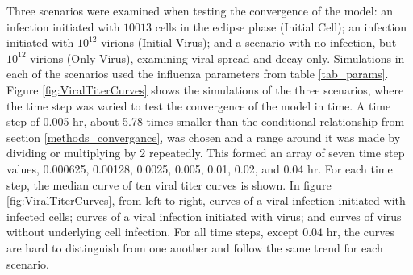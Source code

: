 Three scenarios were examined when testing the convergence of the model: an infection initiated with $10013$ cells in the eclipse phase (Initial Cell); an infection initiated with $10^{12}$ virions (Initial Virus); and a scenario with no infection, but $10^{12}$ virions (Only Virus), examining viral spread and decay only. Simulations in each of the scenarios used the influenza parameters from table \ref{tab_params}. Figure \ref{fig:ViralTiterCurves} shows the simulations of the three scenarios, where the time step was varied to test the convergence of the model in time. A time step of 0.005 hr, about 5.78 times smaller than the conditional relationship from section \ref{methods_convergance}, was chosen and a range around it was made by dividing or multiplying by 2 repeatedly. This formed an array of seven time step values, 0.000625, 0.00128, 0.0025, 0.005, 0.01, 0.02, and 0.04 hr. For each time step, the median curve of ten viral titer curves is shown. In figure \ref{fig:ViralTiterCurves}, from left to right, curves of a viral infection initiated with infected cells; curves of a viral infection initiated with virus; and curves of virus without underlying cell infection. For all time steps, except $0.04$ hr, the curves are hard to distinguish from one another and follow the same trend for each scenario. 

